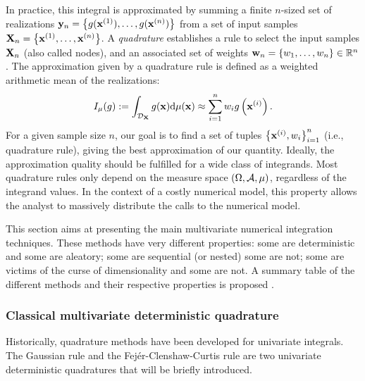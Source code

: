 In practice, this integral is approximated by summing a finite $n$-sized set of realizations ${\bf y}_n = \left\{g({\bf x}^{(1)}), \dots, g({\bf x}^{(n)})\right\}$ from a set of input samples ${\bf X}_n = \left\{{\bf x}^{(1)}, \dots, {\bf x}^{(n)}\right\}$. 
A \textit{quadrature} establishes a rule to select the input samples ${\bf X}_n$ (also called nodes), and an associated set of weights ${\bf w}_n = \{w_1, \dots, w_n\} \in \mathbb{R}^n$. 
The approximation given by a quadrature rule is defined as a weighted arithmetic mean of the realizations:
\begin{equation}
    I_{\mu}(g) := \int_{\mathcal{D}_{\bf X}} g({\bf x}) \mathrm{d}\mu({\bf x}) \approx \sum_{i=1}^n w_i g\left({\bf x}^{(i)}\right).
    \label{eq:quadrature_rule}
\end{equation}
For a given sample size $n$, our goal is to find a set of tuples $\left\{{\bf x}^{(i)}, w_i \right\}_{i=1}^n$ (i.e., quadrature rule), giving the best approximation of our quantity. 
Ideally, the approximation quality should be fulfilled for a wide class of integrands. 
Most quadrature rules only depend on the measure space $(\Omega, \mathcal{A}, \mu)$, regardless of the integrand values.
In the context of a costly numerical model, this property allows the analyst to massively distribute the calls to the numerical model. 

This section aims at presenting the main multivariate numerical integration techniques. 
These methods have very different properties: 
some are deterministic and some are aleatory; 
some are sequential (or nested) some are not; 
some are victims of the curse of dimensionality and some are not. 
A summary table of the different methods and their respective properties is proposed .


\subsubsection{Classical multivariate deterministic quadrature}

Historically, quadrature methods have been developed for univariate integrals. 
The Gaussian rule and the Fejér-Clenshaw-Curtis rule are two univariate deterministic quadratures that will be briefly introduced. 

